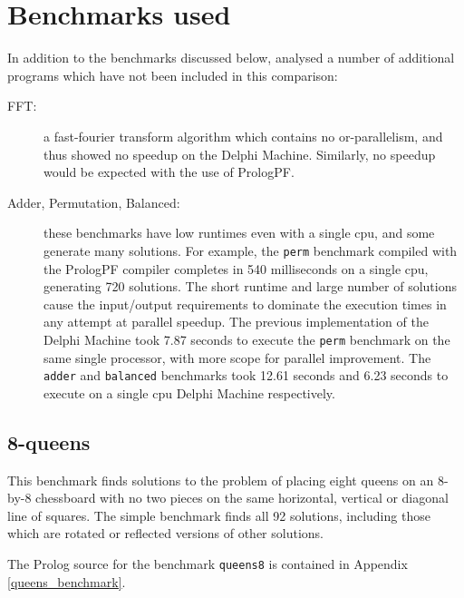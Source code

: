 \section{Benchmarks used} %


In addition to the benchmarks discussed below, \cite{Sar95} analysed a
number of additional programs which have not been included in this comparison:
\begin{description}
\item[FFT:]{ a fast-fourier transform algorithm which contains no
  or-parallelism, and thus showed no speedup on the Delphi Machine.  Similarly,
  no speedup would be expected with the use of PrologPF.}
\item[Adder, Permutation, Balanced:]{ these benchmarks have low runtimes
  even with a single cpu, and some generate many solutions.  For example, the
  \texttt{perm} benchmark compiled with the PrologPF compiler completes in
  540 milliseconds on a single cpu, generating 720 solutions.
  The short runtime and large
  number of solutions cause the input/output requirements to dominate the
  execution times in any attempt at parallel speedup.
  The previous implementation of the Delphi Machine took
  7.87 seconds to execute the \texttt{perm} benchmark on the same single
  processor, with more scope for parallel improvement. The \texttt{adder}
  and \texttt{balanced} benchmarks took 12.61 seconds and 6.23 seconds
  to execute on a single cpu Delphi Machine respectively.}
\end{description}

\subsection{8-queens}


This benchmark finds solutions to the problem of placing eight queens on
an  8-by-8 chessboard with no two pieces on the same horizontal, vertical or
diagonal line of squares.  The simple benchmark finds all 92 solutions,
including those which are rotated or reflected versions of other solutions.

The Prolog source for the benchmark \texttt{queens8} is contained in 
Appendix \ref{queens_benchmark}.

